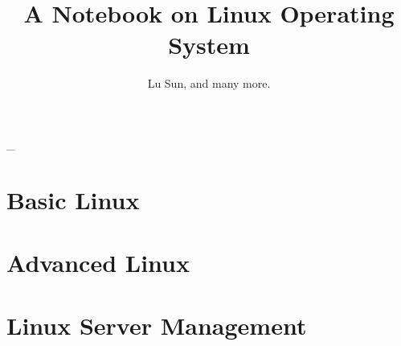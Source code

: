 



\makeindex



\frontmatter

\title{A Notebook on Linux Operating System}
\author{Lu Sun, and many more.}

\maketitle


\tableofcontents


\listoffigures
\listoftables

\mainmatter\_

\part{Basic Linux}















\part{Advanced Linux}









\part{Linux Server Management}

